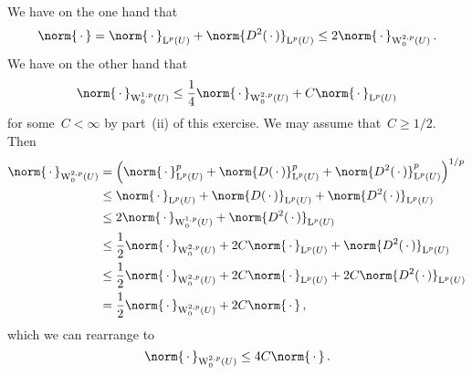 \subsection{}

We have on the one hand that
\[
  \norm{\,\cdot\,}
  =
  \norm{\,\cdot\,}_{\Lp^p(U)}
  +
  \norm{D^2(\,\cdot\,)}_{\Lp^p(U)}
  \leq
  2 \norm{\,\cdot\,}_{\Wp^{2,p}_0(U)} \,.
\]
We have on the other hand that
\[
  \norm{\,\cdot\,}_{\Wp^{1,p}_0(U)}
  \leq
  \frac{1}{4} \norm{\,\cdot\,}_{\Wp^{2,p}_0(U)}
  +
  C \norm{\,\cdot\,}_{\Lp^p(U)}
\]
for some~$C < \infty$ by part~(ii) of this exercise.
We may assume that~$C \geq 1/2$.
Then
\begin{align*}
  \norm{\,\cdot\,}_{\Wp^{2,p}_0(U)}
  &=
  \left(
    \norm{\,\cdot\,}_{\Lp^p(U)}^p
    +
    \norm{D(\,\cdot\,)}_{\Lp^p(U)}^p
    +
    \norm{D^2(\,\cdot\,)}_{\Lp^p(U)}^p
  \right)^{1/p}
  \\
  &\leq
  \norm{\,\cdot\,}_{\Lp^p(U)}
  +
  \norm{D(\,\cdot\,)}_{\Lp^p(U)}
  +
  \norm{D^2(\,\cdot\,)}_{\Lp^p(U)}
  \\
  &\leq
  2 \norm{\,\cdot\,}_{\Wp^{1,p}_0(U)}
  +
  \norm{D^2(\,\cdot\,)}_{\Lp^p(U)}
  \\
  &\leq
  \frac{1}{2} \norm{\,\cdot\,}_{\Wp^{2,p}_0(U)}
  +
  2C \norm{\,\cdot\,}_{\Lp^p(U)}
  +
  \norm{D^2(\,\cdot\,)}_{\Lp^p(U)}
  \\
  &\leq
  \frac{1}{2} \norm{\,\cdot\,}_{\Wp^{2,p}_0(U)}
  +
  2C \norm{\,\cdot\,}_{\Lp^p(U)}
  +
  2C \norm{D^2(\,\cdot\,)}_{\Lp^p(U)}
  \\
  &=
  \frac{1}{2} \norm{\,\cdot\,}_{\Wp^{2,p}_0(U)}
  +
  2C \norm{\,\cdot\,} \,,
\end{align*}
which we can rearrange to
\[
  \norm{\,\cdot\,}_{\Wp^{2,p}_0(U)}
  \leq
  4 C \norm{\,\cdot\,} \,.
\]




